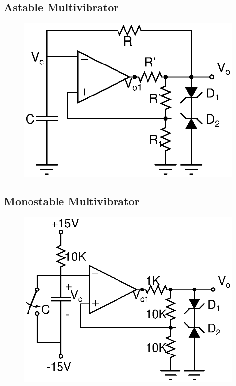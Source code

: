\documentclass[12pt]{article}
\begin{document}
\subsection{Astable Multivibrator}
\begin{figure}[H]
  \begin{center}
    \includegraphics{Astable_Multivibrator.eps}
\end{center}
\end{figure}

\subsection{Monostable Multivibrator}
\begin{figure}[H]
  \begin{center}
    \includegraphics{Monostable_Multivibrator.eps}
\end{center}
\end{figure}
\end{document}
